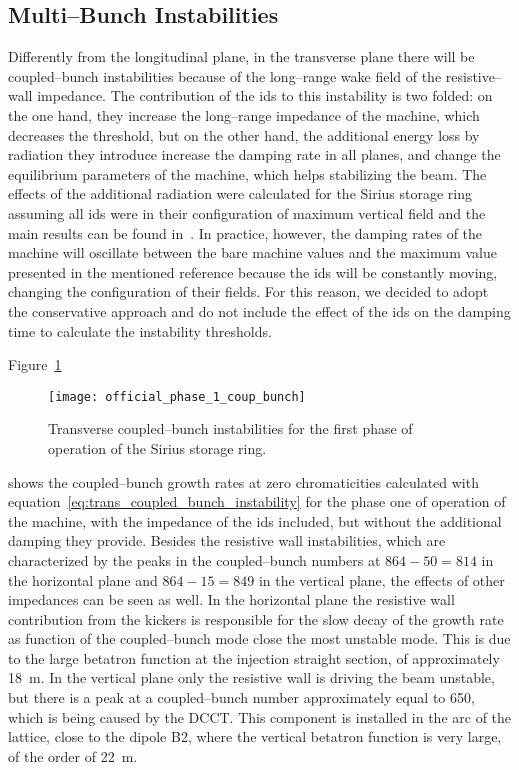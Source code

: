 \subsection{Multi--Bunch Instabilities}

    Differently from the longitudinal plane, in the transverse plane there will be coupled--bunch instabilities because of the long--range wake field of the resistive--wall impedance. The contribution of the \glspl{id} to this instability is two folded: on the one hand, they increase the long--range impedance of the machine, which decreases the threshold, but on the other hand, the additional energy loss by radiation they introduce increase the damping rate in all planes, and change the equilibrium parameters of the machine, which helps stabilizing the beam. The effects of the additional radiation were calculated for the Sirius storage ring assuming all \glspl{id} were in their configuration of maximum vertical field and the main results can be found in~\cite{Sirius2013}. In practice, however, the damping rates of the machine will oscillate between the bare machine values and the maximum value presented in the mentioned reference because the \glspl{id} will be constantly moving, changing the configuration of their fields. For this reason, we decided to adopt the conservative approach and do not include the effect of the \glspl{id} on the damping time to calculate the instability thresholds.

    Figure~\ref{fig:ph1_coup_bunch}
    \begin{figure}
        \centering
        \texttt{[image: official\_phase\_1\_coup\_bunch]}
        \caption{Transverse coupled--bunch instabilities for the first phase of operation of the Sirius storage ring.}
        \label{fig:ph1_coup_bunch}
    \end{figure}
    shows the coupled--bunch growth rates at zero chromaticities calculated with equation~\ref{eq:trans_coupled_bunch_instability} for the phase one of operation of the machine, with the impedance of the \glspl{id} included, but without the additional damping they provide. Besides the resistive wall instabilities, which are characterized by the peaks in the coupled--bunch numbers at $864-50=814$ in the horizontal plane and $864-15=849$ in the vertical plane, the effects of other impedances can be seen as well. In the horizontal plane the resistive wall contribution from the kickers is responsible for the slow decay of the growth rate as function of the coupled--bunch mode close the most unstable mode. This is due to the large betatron function at the injection straight section, of approximately \SI{18}{\meter}. In the vertical plane only the resistive wall is driving the beam unstable, but there is a peak at a coupled--bunch number approximately equal to 650, which is being caused by the DCCT. This component is installed in the arc of the lattice, close to the dipole B2, where the vertical betatron function is very large, of the order of \SI{22}{\meter}.

